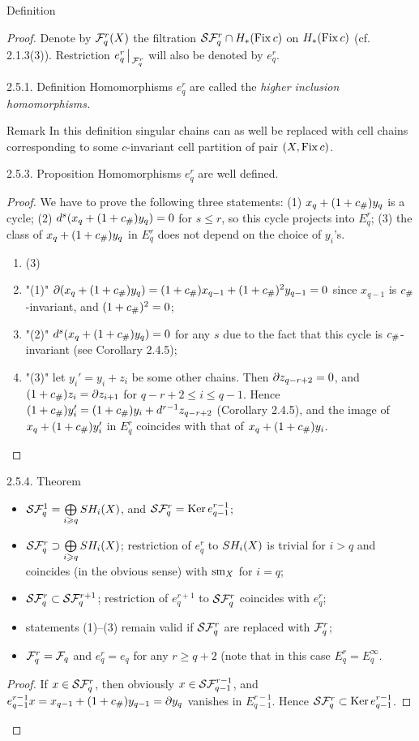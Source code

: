 \documentclass{article}
\begin{document}
\begin{subsubsection}{ Definition}
\begin{proof}
{Denote by $\mathcal F_q^r(X)$ the filtration $\mathcal S\mathcal F_q^r\cap H_*(\operatorname{Fix} c)$
on $H_*(\operatorname{Fix} c)$ (cf. 2.1.3(3)). Restriction
$e_q^r\left|{\vphantom{(_(}}\right._{\mathcal F_q^r}$ will also be denoted by $e_q^r$.
\begin{definition}{{2.5.1. Definition} Homomorphisms $e_q^r$ are called
the {\it higher inclusion homomorphisms.}
}\end{definition}
\begin{remark}{{Remark} In this definition singular chains can as well be replaced
with cell chains corresponding to some $c$-invariant cell partition of
pair $(X,\operatorname{Fix} c)$.
}\end{remark}
\begin{proclaim}{{2.5.3. Proposition} Homomorphisms $e_q^r$ are well defined.
}\end{proclaim}
\begin{proof}{ We have to prove the following three statements:
(1) $x_q+(1+c_\#)y_q$ is a cycle; (2) $d^s(x_q+(1+c_\#)y_q)=0$ for $s\le r$,
so this cycle projects into $E_q^r$; (3) the class of $x_q+(1+c_\#)y_q$
in $E_q^r$ does not depend on the choice of $y_i$'s.
\begin{enumerate}\item{(3)}
\item"(1)" $\partial(x_q+(1+c_\#)y_q)=
(1+c_\#)x_{q-1}+(1+c_\#)^2y_{q-1}=0$
since $x_{q-1}$ is $c_\#$-invariant, and $(1+c_\#)^2=0$;
\item"(2)" $d^s(x_q+(1+c_\#)y_q)=0$ for any $s$ due to the fact that
this cycle is $c_\#$-invariant (see Corollary 2.4.5);
\item"(3)" let $y_i'=y_i+z_i$ be some other chains. Then $\partial z_{q-r+2}=0$,
and $(1+c_\#)z_i=\partial z_{i+1}$ for $q-r+2\le i\le q-1$. Hence
$(1+c_\#)y_i'=(1+c_\#)y_i+d^{r-1}z_{q-r+2}$ (Corollary 2.4.5), and
the image of $x_q+(1+c_\#)y_i'$ in $E_q^r$ coincides with that of
$x_q+(1+c_\#)y_i$. 
\end{enumerate}
}\end{proof}
\begin{proclaim}{{2.5.4. Theorem}
\begin{itemize}
\item $\mathcal S\mathcal F_q^1=\bigoplus\limits_{i\geqslant q}SH_i(X)$, and
$\mathcal S\mathcal F_q^r=\operatorname{Ker} e_{q-1}^{r-1}$;
\item $\mathcal S\mathcal F_q^r\supset\bigoplus\limits_{i\geqslant q}SH_i(X)$;
restriction of $e_q^r$ to $SH_i(X)$ is trivial for
$i>q$ and coincides (in the obvious sense) with $\operatorname{sm}_X$ for $i=q$;
\item $\mathcal S\mathcal F_q^r\subset\mathcal S\mathcal F_q^{r+1}$; restriction of $e_q^{r+1}$ to
$\mathcal S\mathcal F_q^r$ coincides with $e_q^r$;
\item statements (1)--(3) remain valid if $\mathcal S\mathcal F_q^r$ are
replaced with $\mathcal F_q^r$;
\item $\mathcal F_q^r=\mathcal F_q$ and $e_q^r=e_q$ for any $r\ge q+2$
(note that in this case $E_q^r=E_q^\infty$.
\end{itemize}
}\end{proclaim}
\begin{proof}{ If $x\in\mathcal S\mathcal F_q^r$, then obviously $x\in\mathcal S\mathcal F_{q-1}^{r-1}$,
and $e_{q-1}^{r-1}x=x_{q-1}+(1+c_\#)y_{q-1}=\partial y_q$ vanishes in
$E_{q-1}^{r-1}$. Hence $\mathcal S\mathcal F_q^r\subset\operatorname{Ker} e_{q-1}^{r-1}$.

}
\end{proof}}
\end{proof}
\end{subsubsection}
\end{document}
